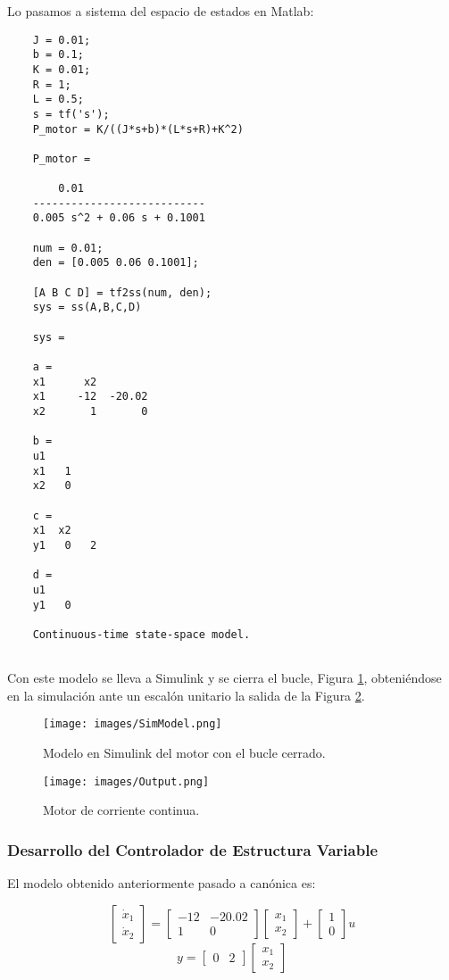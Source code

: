 \documentclass[a4paper, fontsize=11pt]{scrartcl} %
\numberwithin{equation}{section} %
\numberwithin{figure}{section} %
\numberwithin{table}{section} %
\begin{document}
	Lo pasamos a sistema del espacio de estados en Matlab:
	
	\begin{lstlisting}
	J = 0.01;
	b = 0.1;
	K = 0.01;
	R = 1;
	L = 0.5;
	s = tf('s');
	P_motor = K/((J*s+b)*(L*s+R)+K^2)
	
	P_motor =
	
		0.01
	---------------------------
	0.005 s^2 + 0.06 s + 0.1001
	
	num = 0.01;
	den = [0.005 0.06 0.1001];
	
	[A B C D] = tf2ss(num, den);
	sys = ss(A,B,C,D)
	
	sys =
	
	a = 
	x1      x2
	x1     -12  -20.02
	x2       1       0
	
	b = 
	u1
	x1   1
	x2   0
	
	c = 
	x1  x2
	y1   0   2
	
	d = 
	u1
	y1   0
	
	Continuous-time state-space model.
	
	\end{lstlisting}
	
	Con este modelo se lleva a Simulink y se cierra el bucle, Figura \ref{SimModel}, obteniéndose en la simulación ante un escalón unitario la salida de la Figura \ref{Output}.
	
	\begin{figure}[h!]
		\centering
		\texttt{[image: images/SimModel.png]}
		\caption{Modelo en Simulink del motor con el bucle cerrado.}
		\label{SimModel}
	\end{figure}
	\FloatBarrier
	
	\begin{figure}[h!]
		\centering
		\texttt{[image: images/Output.png]}
		\caption{Motor de corriente continua.}
		\label{Output}
	\end{figure}
	\FloatBarrier
	
	\subsubsection{Desarrollo del Controlador de Estructura Variable}
	
	El modelo obtenido anteriormente pasado a canónica es:
	
	\[
	\begin{bmatrix}
	\dot{x}_1\\
	\dot{x}_2
	\end{bmatrix}
	=
	\begin{bmatrix}
	-12 & -20.02\\
	  1 &   0
	\end{bmatrix}
	\begin{bmatrix}
	x_1\\
	x_2
	\end{bmatrix}
	+
	\begin{bmatrix}
	1\\
	0
	\end{bmatrix}
	u
	\]
	\[
	y=
	\begin{bmatrix}
	0 & 2
	\end{bmatrix}
	\begin{bmatrix}
	x_1\\
	x_2
	\end{bmatrix}
	\]
	
\end{document}
